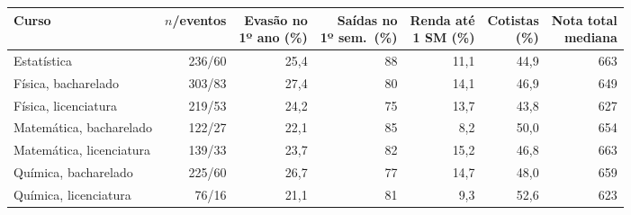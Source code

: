 \begin{tabular}{lrrrrrr}
\toprule
Curso & $n$/eventos & \makecell[r]{Evasão no\\1º ano (\%)} & \makecell[r]{Saídas no\\1º sem.\ (\%)} & \makecell[r]{Renda até\\1 SM (\%)} & \makecell[r]{Cotistas\\(\%)} & \makecell[r]{Nota total\\mediana} \\
\midrule
Estatística & 236/60 & 25,4 & 88 & 11,1 & 44,9 & 663 \\
Física, bacharelado & 303/83 & 27,4 & 80 & 14,1 & 46,9 & 649 \\
Física, licenciatura & 219/53 & 24,2 & 75 & 13,7 & 43,8 & 627 \\
Matemática, bacharelado & 122/27 & 22,1 & 85 & 8,2 & 50,0 & 654 \\
Matemática, licenciatura & 139/33 & 23,7 & 82 & 15,2 & 46,8 & 663 \\
Química, bacharelado & 225/60 & 26,7 & 77 & 14,7 & 48,0 & 659 \\
Química, licenciatura & 76/16 & 21,1 & 81 & 9,3 & 52,6 & 623 \\
\bottomrule
\end{tabular}
